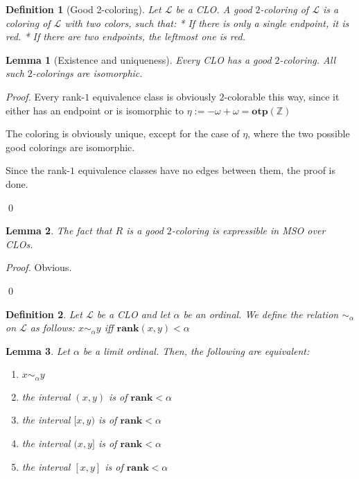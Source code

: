 \documentclass{article}
\newtheorem{lemma}{Lemma}
\newtheorem{definition}{Definition}
\newcommand{\parens}[1]{\left( {#1} \right)}
\newcommand{\rankp}{\mathbf{rank}}
\newcommand{\LL}{\mathcal{L}}
\newcommand{\agemo}{-\omega}
\newcommand{\otp}{\mathbf{otp}}
\newcommand{\ZZ}{\mathbb{Z}}
\begin{document}
\begin{definition}[Good 2-coloring]
    Let $\LL$ be a CLO. A good $2$-coloring of $\LL$ is a coloring of $\LL$ with two colors, such that:
    * If there is only a single endpoint, it is red.
    * If there are two endpoints, the leftmost one is red.
\end{definition}

\begin{lemma}[Existence and uniqueness]
    Every CLO has a good $2$-coloring.
    All such $2$-colorings are isomorphic.
\end{lemma}

\begin{proof}
    Every rank-$1$ equivalence class is obviously $2$-colorable this way, since it either has an endpoint or is isomorphic
    to $\eta := \agemo + \omega = \otp \parens{\ZZ}$

    The coloring is obviously unique, except for the case of $\eta$, where the two possible good colorings are isomorphic.

    Since the rank-$1$ equivalence classes have no edges between them, the proof is done. 

    \qed
\end{proof}

\begin{lemma}
    The fact that $R$ is a good $2$-coloring is expressible in MSO over CLOs. 
\end{lemma}

\begin{proof}
    Obvious.

    \qed
\end{proof}

\begin{definition}
    Let $\LL$ be a CLO and let $\alpha$ be an ordinal.
    We define the relation $\sim_\alpha$ on $\LL$ as follows:
    $x \sim_\alpha y$ iff $\rankp (x, y) < \alpha$
\end{definition}

\begin{lemma}
    Let $\alpha$ be a limit ordinal.
    Then, the following are equivalent:
    \begin{enumerate}
        \item $x \sim_\alpha y$
        \item the interval $(x, y)$ is of $\rankp < \alpha$
        \item the interval $[x, y)$ is of $\rankp < \alpha$
        \item the interval $(x, y]$ is of $\rankp < \alpha$
        \item the interval $[x, y]$ is of $\rankp < \alpha$
    \end{enumerate}
\end{lemma}
\end{document}
